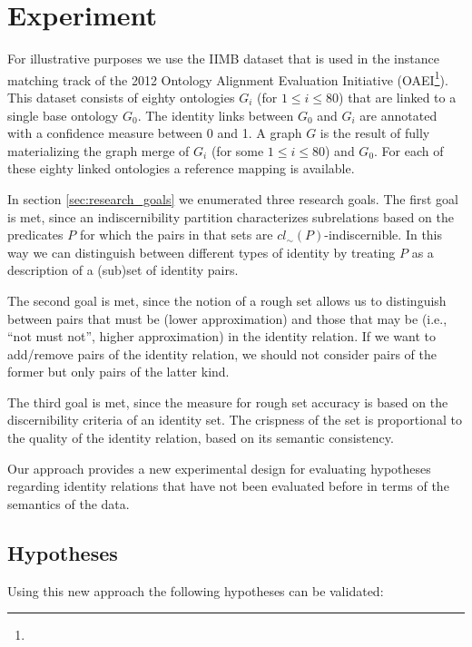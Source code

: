 \section{Experiment}
\label{sec:experimental_design}

For illustrative purposes we use the IIMB dataset that is used in the
  instance matching track of the 2012 Ontology Alignment Evaluation
  Initiative (OAEI\footnote{}).
This dataset consists of eighty ontologies $G_i$ (for $1 \leq i \leq 80$)
  that are linked to a single base ontology $G_0$.
The identity links between $G_0$ and $G_i$ are annotated with a
  confidence measure between 0 and 1.
A graph $G$ is the result of fully materializing the graph merge
  of $G_i$ (for some $1 \leq i \leq 80$) and $G_0$.
For each of these eighty linked ontologies a reference mapping is available.

In section \ref{sec:research_goals} we enumerated three research goals.
The first goal is met, since an indiscernibility partition characterizes
  subrelations based on the predicates $P$ for which the pairs in that sets
  are $cl_{\sim}(P)$-indiscernible.
In this way we can distinguish between different types of identity
  by treating $P$ as a description of a (sub)set of identity pairs.

The second goal is met, since the notion of a rough set allows us to
  distinguish between pairs that must be (lower approximation)
  and those that may be (i.e., ``not must not'', higher approximation)
  in the identity relation.
If we want to add/remove pairs of the identity relation,
  we should not consider pairs of the former but only pairs of
  the latter kind.

The third goal is met, since the measure for rough set accuracy
  is based on the discernibility criteria of an identity set.
The crispness of the set is proportional to the quality of the
  identity relation, based on its semantic consistency.

Our approach provides a new experimental design for evaluating
  hypotheses regarding identity relations that have not been
  evaluated before in terms of the semantics of the data.

\subsection{Hypotheses}
\label{sec:hypotheses}

Using this new approach the following hypotheses can be validated:

